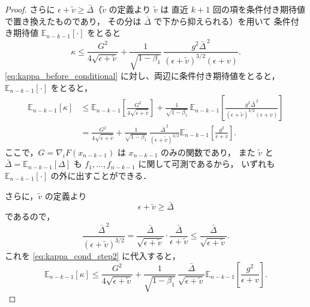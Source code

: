 \documentclass[dvipdfmx,a4paper,11pt]{jsarticle}
\begin{document}
\begin{proof}
さらに $\epsilon + \tilde{v} \geq \bar{\Delta}$（$\tilde{v}$ の定義より $\tilde{v}$ は
直近 $k+1$ 回の項を条件付き期待値で置き換えたものであり，
その分は $\bar{\Delta}$ で下から抑えられる）を用いて
条件付き期待値 $\mathbb{E}_{n-k-1}[\cdot]$ をとると
\begin{equation}
    \kappa \leq \frac{G^2}{4\sqrt{\epsilon+\tilde{v}}}
    + \frac{1}{\sqrt{1-\beta_1}}\,
      \frac{g^2 \bar{\Delta}^{\,2}}{(\epsilon+\tilde{v})^{3/2}(\epsilon+v)}.
    \label{eq:kappa_before_conditional}
\end{equation}
\eqref{eq:kappa_before_conditional} に対し、両辺に条件付き期待値をとると，
$\mathbb{E}_{n-k-1}[\cdot]$ をとると，
\begin{align}
    \mathbb{E}_{n-k-1}[\kappa]
    &\leq
    \mathbb{E}_{n-k-1}\!\left[
      \frac{G^2}{4\sqrt{\epsilon+\tilde{v}}}
    \right]
    + \frac{1}{\sqrt{1-\beta_1}}\,
      \mathbb{E}_{n-k-1}\!\left[
        \frac{g^2 \bar{\Delta}^{\,2}}
             {(\epsilon+\tilde{v})^{3/2}(\epsilon+v)}
      \right]
    \label{eq:kappa_cond_step1}\\
    &= \frac{G^2}{4\sqrt{\epsilon+\tilde{v}}}
    + \frac{1}{\sqrt{1-\beta_1}}\,
      \frac{\bar{\Delta}^{\,2}}{(\epsilon+\tilde{v})^{3/2}}
      \mathbb{E}_{n-k-1}\!\left[
        \frac{g^2}{\epsilon+v}
      \right].
    \label{eq:kappa_cond_step2}
\end{align}
ここで，$G=\nabla_iF(x_{n-k-1})$ は $x_{n-k-1}$ のみの関数であり，
また $\tilde v$ と $\bar\Delta=\mathbb{E}_{n-k-1}[\Delta]$ も
$f_1,\dots,f_{n-k-1}$ に関して可測であるから，
いずれも $\mathbb{E}_{n-k-1}[\cdot]$ の外に出すことができる．

さらに，$\tilde v$ の定義より
\[
  \epsilon+\tilde v \ge \bar\Delta
\]
であるので，
\begin{equation}
    \frac{\bar{\Delta}^{\,2}}{(\epsilon+\tilde{v})^{3/2}}
    =
    \frac{\bar{\Delta}}{\sqrt{\epsilon+\tilde{v}}}
    \cdot
    \frac{\bar{\Delta}}{\epsilon+\tilde{v}}
    \le
    \frac{\bar{\Delta}}{\sqrt{\epsilon+\tilde{v}}}.
    \label{eq:kappa_cond_step3}
\end{equation}
これを \eqref{eq:kappa_cond_step2} に代入すると，
\begin{equation}
    \mathbb{E}_{n-k-1}[\kappa]
    \leq \frac{G^2}{4\sqrt{\epsilon+\tilde{v}}}
    + \frac{1}{\sqrt{1-\beta_1}}\,
      \frac{\bar{\Delta}}{\sqrt{\epsilon+\tilde{v}}}
      \mathbb{E}_{n-k-1}\!\left[\frac{g^2}{\epsilon+v}\right].
    \tag{A.22}
    \label{eq:kappa_bound_Delta}
\end{equation}


\end{proof}
\end{document}
